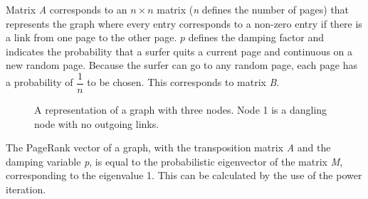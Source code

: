 Matrix \textit{A} corresponds to an $n \times n$ matrix (\textit{n} defines the number of pages) that represents the graph where every entry corresponds to a non-zero entry if there is a link from one page to the other page.
$p$ defines the damping factor and indicates the probability that a surfer quits a current page and continuous on a new random page. Because the surfer can go to any random page, each page has a probability of $\dfrac{1}{n}$ to be chosen. This corresponds to matrix \textit{B}.\\

\begin{figure}
\centering
{}
\caption{A representation of a graph with three nodes. Node 1 is a dangling node with no outgoing links.}
\label{GoogleMatrix}
\end{figure}

% 



The PageRank vector of a graph, with the transposition matrix\textit{ A} and the damping variable \textit{p}, is equal to the probabilistic eigenvector of the matrix \textit{M}, corresponding to the eigenvalue 1. This can be calculated by the use of the power iteration. \\


